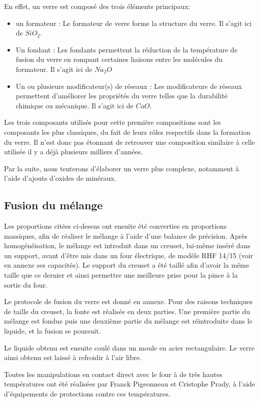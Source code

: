 \documentclass{article}
\begin{document}
En effet, un verre est composé des trois éléments principaux:
\begin{itemize}
    \item un formateur : Le formateur de verre forme la structure du verre. Il s'agit ici de $SiO_2$.
    \item Un fondant : Les fondants permettent la réduction de la température de fusion du verre en rompant certaines liaisons entre les molécules du formateur. Il s'agit ici de $Na_2O$
    \item Un ou plusieurs modificateur(s) de réseaux : Les modificateurs de réseaux permettent d'améliorer les propriétés du verre telles que la durabilité chimique ou mécanique. Il s'agit ici de $CaO$.
\end{itemize}

Les trois composants utilisés pour cette première compositions sont les composants les plus classiques, du fait de leurs rôles respectifs dans la formation du verre. Il n'est donc pas étonnant de retrouver une composition similaire à celle utilisée il y a déjà plusieurs milliers d'années. 

Par la suite, nous tenterons d'élaborer un verre plus complexe, notamment à l'aide d'ajouts d'oxides de minéraux.

\subsection{Fusion du mélange}

Les proportions citées ci-dessus ont ensuite été converties en proportions massiques, afin de réaliser le mélange à l'aide d'une balance de précision. Après homogénéisation, le mélange est introduit dans un creuset, lui-même inséré dans un support, avant d'être mis dans un four électrique, de modèle RHF 14/15 (voir en annexe ses capacités). Le support du creuset a été taillé afin d'avoir la même taille que ce dernier et ainsi permettre une meilleure prise pour la pince à la sortie du four.

Le protocole de fusion du verre est donné en annexe. Pour des raisons techniques de taille du creuset, la fonte est réalisée en deux parties. Une première partie du mélange est fondue puis une deuxième partie du mélange est réintroduite dans le liquide, et la fusion se poursuit.

Le liquide obtenu est ensuite coulé dans un moule en acier rectangulaire. Le verre ainsi obtenu est laissé à refroidir à l'air libre.

Toutes les manipulations en contact direct avec le four à de très hautes températures ont été réalisées par Franck Pigeonneau et Cristophe Prady, à l'aide d'équipements de protections contre ces températures.
\end{document}
